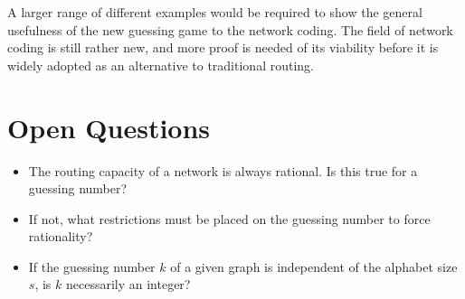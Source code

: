 A larger range of different examples would be required to show the general usefulness of the new guessing game to the network coding. The field of network coding is still rather new, and more proof is needed of its viability before it is widely adopted as an alternative to traditional routing.

\section{Open Questions}

\begin{itemize}\addtolength{\itemsep}{-0.2\baselineskip}
	\item{The routing capacity of a network is always rational. Is this true for a guessing number?}
 	\item{If not, what restrictions must be placed on the guessing number to force rationality?}
 	\item{If the guessing number $k$ of a given graph is independent of the alphabet size $s$, is $k$ necessarily an integer?}
\end{itemize}